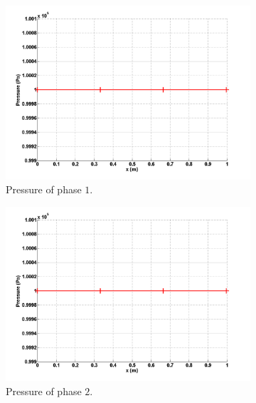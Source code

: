 %
\begin{figure}[H]
        \centering
        \begin{subfigure}[b]{0.495\textwidth}
                \centering
                \includegraphics[width=\textwidth]{figures/liquid_pressure.png}
                \caption{Pressure of phase $1$.}
                \label{fig:press-vap-7-eqn-sect4}
        \end{subfigure}%
        \begin{subfigure}[b]{0.495\textwidth}
                \centering
                \includegraphics[width=\textwidth]{figures/vapor_pressure.png}
                \caption{Pressure of phase $2$.}
                \label{fig:press-vap-7-eqn-sect4}
        \end{subfigure}
        \caption{\label{fig:inlet_sct3}}
\end{figure}
